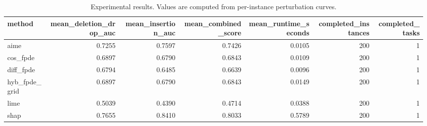 \begin{table}[t]
\caption{Experimental results. Values are computed from per-instance perturbation curves.}
\label{tab:main_results_computed}
\centering
\begin{tabular}{lrrrrrr}
\toprule
method & mean\_deletion\_drop\_auc & mean\_insertion\_auc & mean\_combined\_score & mean\_runtime\_seconds & completed\_instances & completed\_tasks \\
\midrule
aime & 0.7255 & 0.7597 & 0.7426 & 0.0105 & 200 & 1 \\
cos\_fpde & 0.6897 & 0.6790 & 0.6843 & 0.0109 & 200 & 1 \\
diff\_fpde & 0.6794 & 0.6485 & 0.6639 & 0.0096 & 200 & 1 \\
hyb\_fpde\_grid & 0.6897 & 0.6790 & 0.6843 & 0.0149 & 200 & 1 \\
lime & 0.5039 & 0.4390 & 0.4714 & 0.0388 & 200 & 1 \\
shap & 0.7655 & 0.8410 & 0.8033 & 0.5789 & 200 & 1 \\
\bottomrule
\end{tabular}

\end{table}
